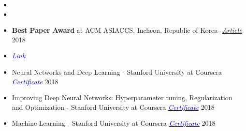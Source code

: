 
\begin{itemize}[noitemsep,topsep=0pt]
	\item {}
	\item {}
	\item \textbf{Best Paper Award} at ACM ASIACCS, Incheon, Republic of Korea- \href{https://www.bu.edu/eng/2018/08/14/best-paper-award-asia-conference-on-computer-and-communication-security-2018/}{ \textit{Article}} 2018
	\item {} \href{https://hdl.handle.net/2144/27051}{\textit{\textcolor{blue}{Link}}}
	\item Neural Networks and Deep Learning - Stanford University at Coursera \href{https://www.coursera.org/account/accomplishments/certificate/ZU26W977NR9P}{\textit{\textcolor{blue}{Certificate}}} 2018
	\item Improving Deep Neural Networks: Hyperparameter tuning, Regularization and Optimization - Stanford University at Coursera \href{https://www.coursera.org/account/accomplishments/certificate/U5YHWN3XSAQU}{\textit{\textcolor{blue}{Certificate}}} 2018
	\item Machine Learning - Stanford University at Coursera  \href{https://www.coursera.org/account/accomplishments/verify/U5YHWN3XSAQU}{\textit{\textcolor{blue}{Certificate}}} 2018
\end{itemize}